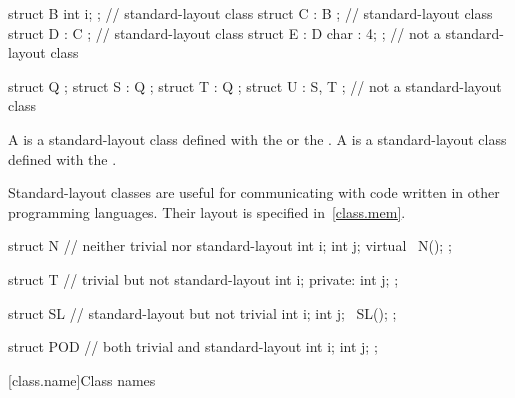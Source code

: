 \pnum
\begin{example}
\begin{codeblock}
struct B { int i; };            // standard-layout class
struct C : B { };               // standard-layout class
struct D : C { };               // standard-layout class
struct E : D { char : 4; };     // not a standard-layout class

struct Q {};
struct S : Q { };
struct T : Q { };
struct U : S, T { };            // not a standard-layout class
\end{codeblock}
\end{example}

\pnum
A  is a standard-layout class
defined with the   or the
 .
A  is a standard-layout class
defined with the
 .

\pnum
\begin{note}
Standard-layout classes are useful for communicating with
code written in other programming languages. Their layout is specified
in~\ref{class.mem}.
\end{note}

\pnum
\begin{example}
\begin{codeblock}
struct N {          // neither trivial nor standard-layout
  int i;
  int j;
  virtual ~N();
};

struct T {          // trivial but not standard-layout
  int i;
private:
  int j;
};

struct SL {         // standard-layout but not trivial
  int i;
  int j;
  ~SL();
};

struct POD {        // both trivial and standard-layout
  int i;
  int j;
};
\end{codeblock}
\end{example}

[class.name]{Class names}
%
%
%


